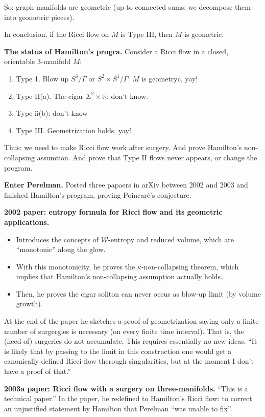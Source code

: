 \noindent
So: graph manifolds are geometric (up to
connected sums; we decompose them into
geometric pieces).

In conclusion, if
the Ricci flow on $M$ is Type III,
then $M$ is geometric.

\medskip\noindent
{\bf The status of Hamilton's progra.}
Consider a Ricci flow in a closed,
orientable 3-manifold $M$:
\begin{enumerate}
\item Type 1. Blow up $S^3/\Gamma$
or $S^2\times S^1/\Gamma$: $M$ is geometryc,
yay!
\item Type II(a). The cigar $\Sigma^2 \times
\mathbb{R}$: don't know.
\item Type ii(b): don't know
\item Type III. Geometrization holds, yay!
\end{enumerate}

\noindent
Thus: we need to make Ricci flow work after
surgery.
And prove Hamilton's non-collapsing
assumtion.
And prove that Type II flows never appears,
or change the program.

\medskip\noindent
{\bf Enter Perelman.}
Posted three papaers in arXiv between 2002
and 2003 and finished Hamilton's program,
proving Poincaré's conjecture.

\medskip\noindent
{\bf 2002 paper: entropy formula for Ricci
flow and its geometric applications.}

\begin{itemize}
\item Introduces the concepts of
$\mathcal{W}$-entropy and reduced volume,
which are ``monotonic'' along the glow.
\item With this monotonicity, he proves the
$\kappa$-non-collapsing theorem, which
implies that Hamilton's non-collapsing
assumption actually holds.
\item Then, he proves the cigar soliton
can never occus as blow-up limit (by volume
growth).
\end{itemize}

\noindent
At the end of the paper he sketches a proof
of geometrization saying only a finite
number of surgergies is necessary 
(on every finite time interval).
That is, the (need of)
surgeries do not accumulate.
This requires essentially no new ideas.
``It is likely that by passing to the limit in
this construction one would get a
canonically defined Ricci flow therough
singularities, but at the moment I don't
have a proof of that.''

\medskip\noindent
{\bf 2003a paper: Ricci flow with a surgery
on three-manifolds.}
``This is a technical paper.''
In the paper, he redefined to Hamilton's
Ricci flow: to correct an unjustified
statement by Hamilton that Perelman
``was unable to fix''.

